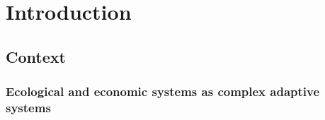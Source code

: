 %
\graphicspath{{./content/introduction/figures/}}

\chapter{Introduction}



\label{chap:intro}

\section{Context}

\subsection{Ecological and economic systems as complex adaptive systems}

